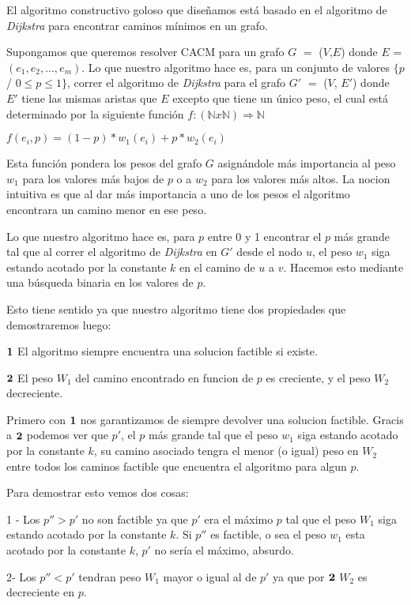 El algoritmo constructivo goloso que diseñamos está basado en el algoritmo de \emph{Dijkstra} para encontrar caminos mínimos en un grafo. 

Supongamos que queremos resolver CACM para un grafo $G$ $=$ ($V$,$E$) donde $E$ = $(e_1, e_2, ..., e_m)$. Lo que nuestro algoritmo hace es, para un conjunto de valores $\{p$ / $0 \leq p \leq 1\}$, correr el algoritmo de \emph{Dijkstra} para el grafo $G'$ $=$ ($V$, $E'$) donde $E'$ tiene las mismas aristas que $E$ excepto que tiene un único peso, el cual está determinado por la siguiente función $f: (\mathbb{N} x \mathbb{N}) \Rightarrow \mathbb{N}$

$f(e_i,p) = (1-p)*w_1(e_i) + p*w_2(e_i)$

Esta función pondera los pesos del grafo $G$ asignándole más importancia al peso $w_1$ para los valores más bajos de $p$ o a $w_2$ para los valores más altos. La nocion intuitiva es que al dar m\'as importancia a uno de los pesos el algoritmo encontrara un camino menor en ese peso.

Lo que nuestro algoritmo hace es, para $p$ entre 0 y 1 encontrar el $p$ más grande tal que al correr el algoritmo de \emph{Dijkstra} en $G'$ desde el nodo $u$, el peso $w_1$ siga estando acotado por la constante $k$ en el camino de $u$ a $v$. Hacemos esto mediante una búsqueda binaria en los valores de $p$.

Esto tiene sentido ya que nuestro algoritmo tiene dos propiedades que demostraremos luego:

$\bold{1}$ El algoritmo siempre encuentra una solucion factible si existe.

$\bold{2}$ El peso $W_1$ del camino encontrado en funcion de $p$ es creciente, y el peso $W_2$ decreciente.

Primero con $\bold{1}$ nos garantizamos de siempre devolver una solucion factible.
Gracis a $\bold{2}$ podemos ver que $p'$, el $p$ más grande tal que el peso $w_1$ siga estando acotado por la constante $k$, su camino asociado tengra el menor (o igual) peso en $W_2$ entre todos los caminos factible que encuentra el algoritmo para algun $p$.

Para demostrar esto vemos dos cosas:

1 - Los $p'' > p'$ no son factible ya que $p'$ era el m\'aximo $p$  tal que el peso $W_1$ siga estando acotado por la constante $k$. Si $p''$ es factible, o sea el peso $w_1$ esta acotado por la constante $k$, $p'$ no ser\'ia el m\'aximo, absurdo.

2- Los $p'' < p'$ tendran peso $W_1$ mayor o igual al de $p'$ ya que por $\bold{2}$ $W_2$ es decreciente en $p$.


